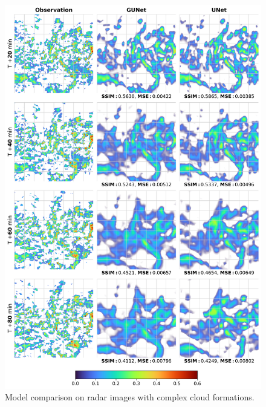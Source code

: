 \begin{figure}[ht]
    \centering
    \includegraphics[width=\textwidth]{images/comparison_square_09.png}
    \caption[Comparison of weather predictions of both models (3)]{\label{fig:comparison_09}Model comparison on radar images with complex cloud formations.}
\end{figure}

